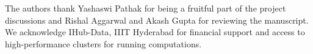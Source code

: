 \documentclass[journal=jacsat,manuscript=article]{achemso}
\begin{document}
\begin{acknowledgement}
    The authors thank Yashaswi Pathak for being a fruitful part of the project discussions and Rishal Aggarwal and Akash Gupta for reviewing the manuscript. We acknowledge IHub-Data, IIIT Hyderabad for financial support and access to high-performance clusters for running computations.
\end{acknowledgement}


\end{document}
